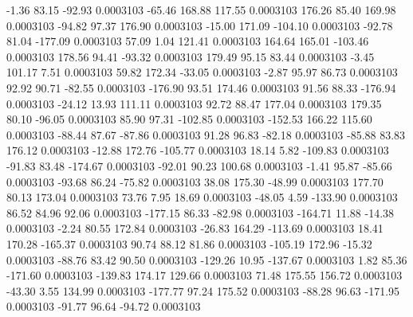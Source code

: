        -1.36       83.15      -92.93     0.0003103
      -65.46      168.88      117.55     0.0003103
      176.26       85.40      169.98     0.0003103
      -94.82       97.37      176.90     0.0003103
      -15.00      171.09     -104.10     0.0003103
      -92.78       81.04     -177.09     0.0003103
       57.09        1.04      121.41     0.0003103
      164.64      165.01     -103.46     0.0003103
      178.56       94.41      -93.32     0.0003103
      179.49       95.15       83.44     0.0003103
       -3.45      101.17        7.51     0.0003103
       59.82      172.34      -33.05     0.0003103
       -2.87       95.97       86.73     0.0003103
       92.92       90.71      -82.55     0.0003103
     -176.90       93.51      174.46     0.0003103
       91.56       88.33     -176.94     0.0003103
      -24.12       13.93      111.11     0.0003103
       92.72       88.47      177.04     0.0003103
      179.35       80.10      -96.05     0.0003103
       85.90       97.31     -102.85     0.0003103
     -152.53      166.22      115.60     0.0003103
      -88.44       87.67      -87.86     0.0003103
       91.28       96.83      -82.18     0.0003103
      -85.88       83.83      176.12     0.0003103
      -12.88      172.76     -105.77     0.0003103
       18.14        5.82     -109.83     0.0003103
      -91.83       83.48     -174.67     0.0003103
      -92.01       90.23      100.68     0.0003103
       -1.41       95.87      -85.66     0.0003103
      -93.68       86.24      -75.82     0.0003103
       38.08      175.30      -48.99     0.0003103
      177.70       80.13      173.04     0.0003103
       73.76        7.95       18.69     0.0003103
      -48.05        4.59     -133.90     0.0003103
       86.52       84.96       92.06     0.0003103
     -177.15       86.33      -82.98     0.0003103
     -164.71       11.88      -14.38     0.0003103
       -2.24       80.55      172.84     0.0003103
      -26.83      164.29     -113.69     0.0003103
       18.41      170.28     -165.37     0.0003103
       90.74       88.12       81.86     0.0003103
     -105.19      172.96      -15.32     0.0003103
      -88.76       83.42       90.50     0.0003103
     -129.26       10.95     -137.67     0.0003103
        1.82       85.36     -171.60     0.0003103
     -139.83      174.17      129.66     0.0003103
       71.48      175.55      156.72     0.0003103
      -43.30        3.55      134.99     0.0003103
     -177.77       97.24      175.52     0.0003103
      -88.28       96.63     -171.95     0.0003103
      -91.77       96.64      -94.72     0.0003103
